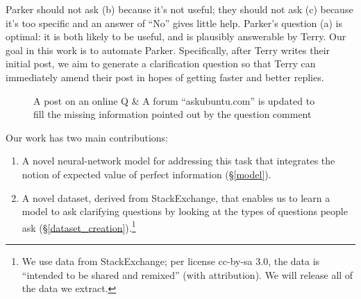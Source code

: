 \documentclass[11pt,a4paper]{article}
\begin{document}
\noindent
Parker should not ask (b) because it's not useful; they should not ask (c) because it's too specific and an answer of ``No'' gives little help.
Parker's question (a) is optimal: it is both likely to be useful, and is plausibly answerable by Terry.
Our goal in this work is to automate Parker.
Specifically, after Terry writes their initial post, we aim to generate a clarification question so that Terry can immediately amend their post in hopes of getting faster and better replies.
\begin{figure}[!t]
	\centering
	\setlength\fboxsep{1pt}
	\setlength\fboxrule{0.5pt}
	\caption{A post on an online Q \& A forum ``askubuntu.com'' is updated to fill the missing information pointed out by the question comment}
	\label{askubuntu_post}
\end{figure}
%

Our work has two main contributions: 
\begin{enumerate}
\item A novel neural-network model for addressing this task that integrates the notion of expected value of perfect information (\S\ref{model}). %
\item A novel dataset, derived from StackExchange, that enables us to learn a model to ask clarifying questions by looking at the types of questions people ask (\S\ref{dataset_creation}).\footnote{We use data from StackExchange; per license cc-by-sa 3.0, the data is ``intended to be shared and remixed'' (with attribution). We will release all of the data we extract.}
\end{enumerate}
\end{document}

